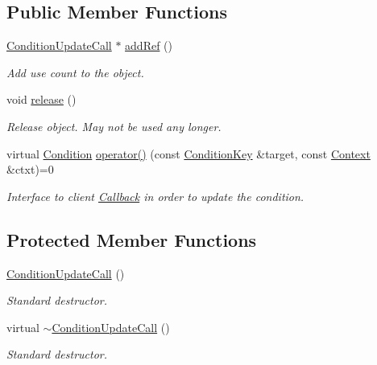 \subsection*{Public Member Functions}
\begin{DoxyCompactItemize}
\item 
\hyperlink{class_d_d4hep_1_1_conditions_1_1_condition_update_call}{Condition\+Update\+Call} $\ast$ \hyperlink{class_d_d4hep_1_1_conditions_1_1_condition_update_call_a6cba5a3773d6291e478b575d1083910f}{add\+Ref} ()
\begin{DoxyCompactList}\small\item\em Add use count to the object. \end{DoxyCompactList}\item 
void \hyperlink{class_d_d4hep_1_1_conditions_1_1_condition_update_call_a6009b30c5c1d14c3c489c84d2042f4fe}{release} ()
\begin{DoxyCompactList}\small\item\em Release object. May not be used any longer. \end{DoxyCompactList}\item 
virtual \hyperlink{class_d_d4hep_1_1_conditions_1_1_condition}{Condition} \hyperlink{class_d_d4hep_1_1_conditions_1_1_condition_update_call_adc561aca8c6bf851e0ee53f719b26a44}{operator()} (const \hyperlink{class_d_d4hep_1_1_conditions_1_1_condition_key}{Condition\+Key} \&target, const \hyperlink{class_d_d4hep_1_1_conditions_1_1_condition_update_call_a96b8a912f3a2ea17f139a5f5dcac7146}{Context} \&ctxt)=0
\begin{DoxyCompactList}\small\item\em Interface to client \hyperlink{class_d_d4hep_1_1_callback}{Callback} in order to update the condition. \end{DoxyCompactList}\end{DoxyCompactItemize}
\subsection*{Protected Member Functions}
\begin{DoxyCompactItemize}
\item 
\hyperlink{class_d_d4hep_1_1_conditions_1_1_condition_update_call_a23a8cb42aaec80443044176c061f5281}{Condition\+Update\+Call} ()
\begin{DoxyCompactList}\small\item\em Standard destructor. \end{DoxyCompactList}\item 
virtual \hyperlink{class_d_d4hep_1_1_conditions_1_1_condition_update_call_a1dd8b3414b91f74877af4325c0a0e3c4}{$\sim$\+Condition\+Update\+Call} ()
\begin{DoxyCompactList}\small\item\em Standard destructor. \end{DoxyCompactList}\end{DoxyCompactItemize}
